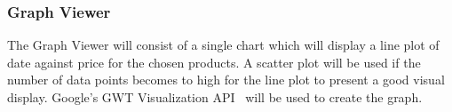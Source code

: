 \subsubsection{Graph Viewer}

The Graph Viewer will consist of a single chart which will display a line plot of date against price for the chosen products. 
A scatter plot will be used if the number of data points becomes to high for the line plot to present a good visual display. 
Google's GWT Visualization API~\cite{viz} will be used to create the graph.

